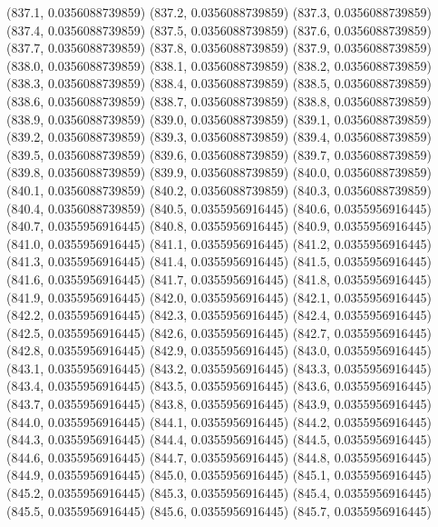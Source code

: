 {					(837.1, 0.0356088739859)
					(837.2, 0.0356088739859)
					(837.3, 0.0356088739859)
					(837.4, 0.0356088739859)
					(837.5, 0.0356088739859)
					(837.6, 0.0356088739859)
					(837.7, 0.0356088739859)
					(837.8, 0.0356088739859)
					(837.9, 0.0356088739859)
					(838.0, 0.0356088739859)
					(838.1, 0.0356088739859)
					(838.2, 0.0356088739859)
					(838.3, 0.0356088739859)
					(838.4, 0.0356088739859)
					(838.5, 0.0356088739859)
					(838.6, 0.0356088739859)
					(838.7, 0.0356088739859)
					(838.8, 0.0356088739859)
					(838.9, 0.0356088739859)
					(839.0, 0.0356088739859)
					(839.1, 0.0356088739859)
					(839.2, 0.0356088739859)
					(839.3, 0.0356088739859)
					(839.4, 0.0356088739859)
					(839.5, 0.0356088739859)
					(839.6, 0.0356088739859)
					(839.7, 0.0356088739859)
					(839.8, 0.0356088739859)
					(839.9, 0.0356088739859)
					(840.0, 0.0356088739859)
					(840.1, 0.0356088739859)
					(840.2, 0.0356088739859)
					(840.3, 0.0356088739859)
					(840.4, 0.0356088739859)
					(840.5, 0.0355956916445)
					(840.6, 0.0355956916445)
					(840.7, 0.0355956916445)
					(840.8, 0.0355956916445)
					(840.9, 0.0355956916445)
					(841.0, 0.0355956916445)
					(841.1, 0.0355956916445)
					(841.2, 0.0355956916445)
					(841.3, 0.0355956916445)
					(841.4, 0.0355956916445)
					(841.5, 0.0355956916445)
					(841.6, 0.0355956916445)
					(841.7, 0.0355956916445)
					(841.8, 0.0355956916445)
					(841.9, 0.0355956916445)
					(842.0, 0.0355956916445)
					(842.1, 0.0355956916445)
					(842.2, 0.0355956916445)
					(842.3, 0.0355956916445)
					(842.4, 0.0355956916445)
					(842.5, 0.0355956916445)
					(842.6, 0.0355956916445)
					(842.7, 0.0355956916445)
					(842.8, 0.0355956916445)
					(842.9, 0.0355956916445)
					(843.0, 0.0355956916445)
					(843.1, 0.0355956916445)
					(843.2, 0.0355956916445)
					(843.3, 0.0355956916445)
					(843.4, 0.0355956916445)
					(843.5, 0.0355956916445)
					(843.6, 0.0355956916445)
					(843.7, 0.0355956916445)
					(843.8, 0.0355956916445)
					(843.9, 0.0355956916445)
					(844.0, 0.0355956916445)
					(844.1, 0.0355956916445)
					(844.2, 0.0355956916445)
					(844.3, 0.0355956916445)
					(844.4, 0.0355956916445)
					(844.5, 0.0355956916445)
					(844.6, 0.0355956916445)
					(844.7, 0.0355956916445)
					(844.8, 0.0355956916445)
					(844.9, 0.0355956916445)
					(845.0, 0.0355956916445)
					(845.1, 0.0355956916445)
					(845.2, 0.0355956916445)
					(845.3, 0.0355956916445)
					(845.4, 0.0355956916445)
					(845.5, 0.0355956916445)
					(845.6, 0.0355956916445)
					(845.7, 0.0355956916445)
}
